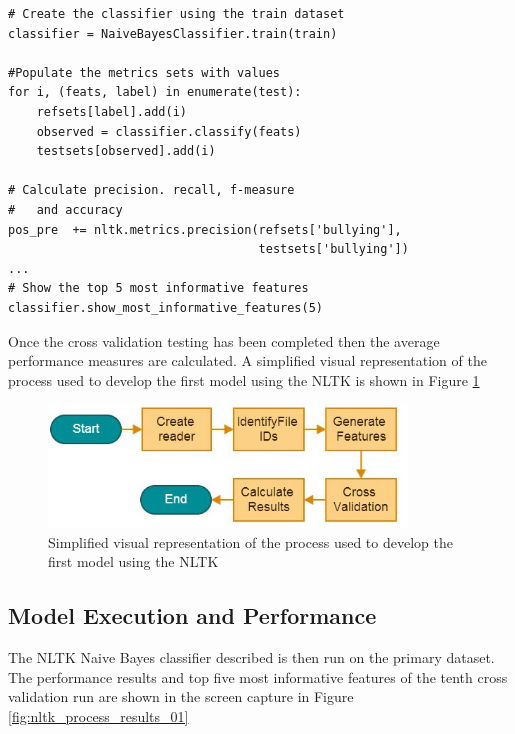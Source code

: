 \begin{lstlisting}[caption={Generation of the positive and negative feature dictionaries},label=lst:chapter5.1:snipet_04]
# Create the classifier using the train dataset
classifier = NaiveBayesClassifier.train(train)
 
#Populate the metrics sets with values
for i, (feats, label) in enumerate(test):
    refsets[label].add(i)
    observed = classifier.classify(feats)
    testsets[observed].add(i)
        
# Calculate precision. recall, f-measure
#   and accuracy
pos_pre  += nltk.metrics.precision(refsets['bullying'],
                                   testsets['bullying'])
...
# Show the top 5 most informative features
classifier.show_most_informative_features(5)
\end{lstlisting}

Once the cross validation testing has been completed then the average performance measures are calculated. A simplified visual representation of the process used to develop the first model using the NLTK is shown in Figure \ref{fig:chapter5:nltk_process_01}

\begin{figure}[htbp]
	\centering
	\includegraphics[width=0.85\textwidth]{Figures/Chapter5/nltk_process_01.jpg}
	\caption[NLTK model development process]{Simplified visual representation of the process used to develop the first model using the NLTK}
	\label{fig:chapter5:nltk_process_01}
\end{figure}

\subsection{Model Execution and Performance}

The NLTK Naive Bayes classifier described is then run on the primary dataset. The performance results and top five most informative features of the tenth cross validation run are shown in the screen capture in Figure \ref{fig:nltk_process_results_01}

